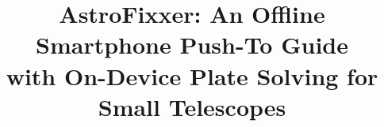 \documentclass[conference]{IEEEtran}
\begin{document}
\title{AstroFixxer: An Offline Smartphone Push-To Guide\\with On-Device Plate Solving for Small Telescopes}

\author{
}

\maketitle












\end{document}
